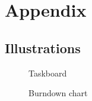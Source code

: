 \section*{Appendix}
\renewcommand*\thesubsection{\Roman{subsection}} %
\subsection{Illustrations} \label{illustrations}
\begin{figure}[H]
  \caption{Taskboard}
  \label{taskboard}
\end{figure}
\begin{figure}[H]
  \caption{Burndown chart}
  \label{burndown}
\end{figure}

